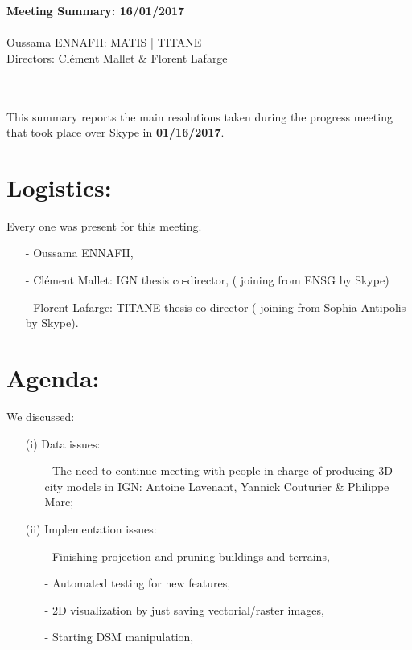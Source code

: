 \documentclass[a4paper, 11pt]{article}
\begin{document}
	\begin{centering}
		\large\textbf{Meeting Summary: 16/01/2017}\\
		~\\
		Oussama ENNAFII:
		\normalsize MATIS | TITANE \\
		Directors: Cl\'ement Mallet \& Florent Lafarge \\
	\end{centering}
	
	~\\~\\
	This summary reports the main resolutions taken during the progress meeting that took place over Skype in \textbf{01/16/2017}.
	\section*{Logistics:}
	Every one was present for this meeting.
	\begin{itemize}
		\item[-] Oussama ENNAFII,
		\item[-] Cl\'ement Mallet: IGN thesis co-director, ( joining from ENSG by Skype)
		\item[-] Florent Lafarge: TITANE thesis co-director ( joining from Sophia-Antipolis by Skype).
	\end{itemize}
	
	\section*{Agenda:}
	
	We discussed: 
	\begin{itemize}
		\item[(i)] Data issues:
		\begin{itemize}
			\item[-] The need to continue meeting with people in charge of producing 3D city models in IGN: Antoine Lavenant, Yannick Couturier \& Philippe Marc;
		\end{itemize}
		\item[(ii)] Implementation issues:
		\begin{itemize}
			\item[-] Finishing projection and pruning buildings and terrains,
			\item[-] Automated testing for new features,
			\item[-] 2D visualization by just saving vectorial/raster images,
			\item[-] Starting DSM manipulation,
		\end{itemize}
	\end{itemize}
	
\end{document}
